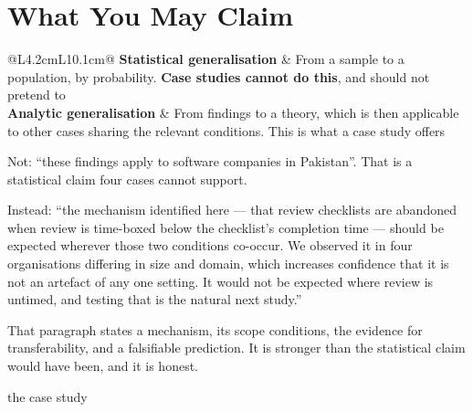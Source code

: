 \section{What You May Claim}

\begin{center}
\small
\begin{tabular}{@{}L{4.2cm}L{10.1cm}@{}}
\toprule
\textbf{Statistical generalisation} & From a sample to a population, by
                                      probability. \textbf{Case studies cannot
                                      do this}, and should not pretend to \\
\textbf{Analytic generalisation}    & From findings to a theory, which is then
                                      applicable to other cases sharing the
                                      relevant conditions. This is what a case
                                      study offers \\
\bottomrule
\end{tabular}
\end{center}

\begin{conceptbox}
Not: ``these findings apply to software companies in Pakistan''. That is a
statistical claim four cases cannot support.

\medskip
Instead: ``the mechanism identified here --- that review checklists are
abandoned when review is time-boxed below the checklist's completion time ---
should be expected wherever those two conditions co-occur. We observed it in
four organisations differing in size and domain, which increases confidence
that it is not an artefact of any one setting. It would not be expected where
review is untimed, and testing that is the natural next study.''

\medskip
That paragraph states a mechanism, its scope conditions, the evidence for
transferability, and a falsifiable prediction. It is stronger than the
statistical claim would have been, and it is honest.
\end{conceptbox}

\begin{traditions}{the case study}
\end{traditions}

